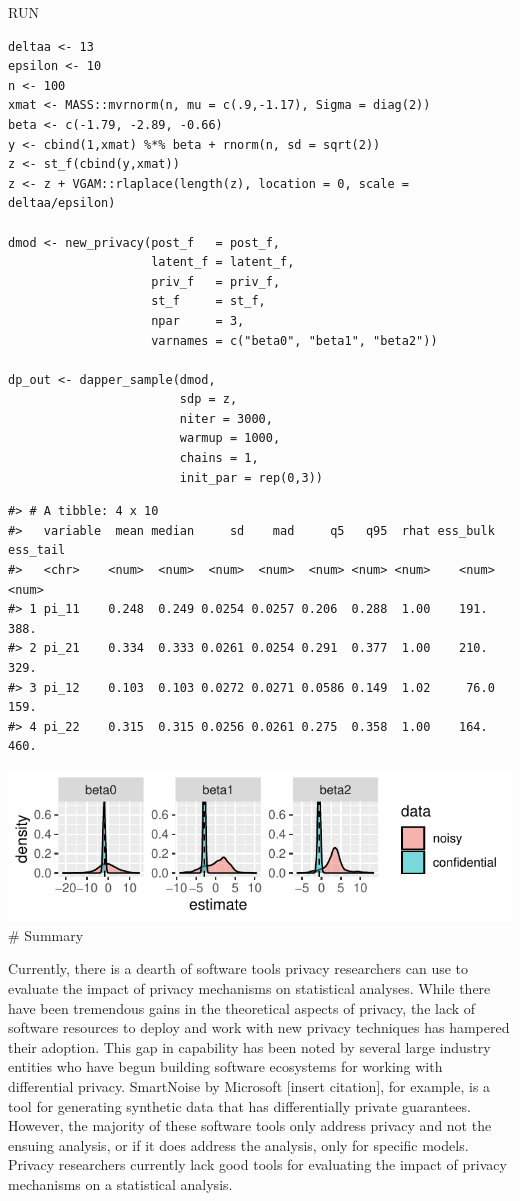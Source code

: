 RUN

\begin{verbatim}
deltaa <- 13
epsilon <- 10
n <- 100
xmat <- MASS::mvrnorm(n, mu = c(.9,-1.17), Sigma = diag(2))
beta <- c(-1.79, -2.89, -0.66)
y <- cbind(1,xmat) %*% beta + rnorm(n, sd = sqrt(2))
z <- st_f(cbind(y,xmat))
z <- z + VGAM::rlaplace(length(z), location = 0, scale = deltaa/epsilon)

dmod <- new_privacy(post_f   = post_f,
                    latent_f = latent_f,
                    priv_f   = priv_f,
                    st_f     = st_f,
                    npar     = 3,
                    varnames = c("beta0", "beta1", "beta2"))

dp_out <- dapper_sample(dmod,
                        sdp = z,
                        niter = 3000,
                        warmup = 1000,
                        chains = 1,
                        init_par = rep(0,3))
\end{verbatim}

\begin{verbatim}
#> # A tibble: 4 x 10
#>   variable  mean median     sd    mad     q5   q95  rhat ess_bulk ess_tail
#>   <chr>    <num>  <num>  <num>  <num>  <num> <num> <num>    <num>    <num>
#> 1 pi_11    0.248  0.249 0.0254 0.0257 0.206  0.288  1.00    191.      388.
#> 2 pi_21    0.334  0.333 0.0261 0.0254 0.291  0.377  1.00    210.      329.
#> 3 pi_12    0.103  0.103 0.0272 0.0271 0.0586 0.149  1.02     76.0     159.
#> 4 pi_22    0.315  0.315 0.0256 0.0261 0.275  0.358  1.00    164.      460.
\end{verbatim}

\includegraphics{dppaper_files/figure-latex/unnamed-chunk-22-1.pdf}
\# Summary

Currently, there is a dearth of software tools privacy researchers can use
to evaluate the impact of privacy mechanisms on statistical analyses.
While there have been tremendous gains in the theoretical aspects of privacy,
the lack of software resources to deploy and work with new privacy techniques has
hampered their adoption. This gap in capability has been noted by several
large industry entities who have begun building software ecosystems for
working with differential privacy. SmartNoise by Microsoft {[}insert citation{]}, for example,
is a tool for generating synthetic data that has differentially private guarantees.
However, the majority of these software tools only address privacy and not the
ensuing analysis, or if it does address the analysis, only for specific models.
Privacy researchers currently lack good tools for evaluating the impact
of privacy mechanisms on a statistical analysis.

